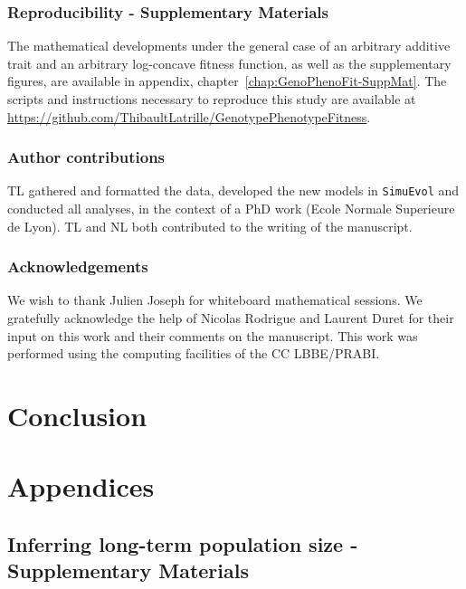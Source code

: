 \documentclass[a4paper,oneside,nobind]{thesis}
\begin{document}
    {\hypersetup{linkcolor=GREYDARK}\minitoc}

    


    \section{Reproducibility - Supplementary Materials}
    The mathematical developments under the general case of an arbitrary additive trait and an arbitrary log-concave fitness function, as well as the supplementary figures, are available in appendix, chapter~\ref{chap:GenoPhenoFit-SuppMat}.
    The scripts and instructions necessary to reproduce this study are available at \url{https://github.com/ThibaultLatrille/GenotypePhenotypeFitness}.


    \section{Author contributions}
    TL gathered and formatted the data, developed the new models in \texttt{SimuEvol} and conducted all analyses, in the context of a PhD work (Ecole Normale Superieure de Lyon).
    TL and NL both contributed to the writing of the manuscript.


    \section{Acknowledgements}
    We wish to thank Julien Joseph for whiteboard mathematical sessions.
    We gratefully acknowledge the help of Nicolas Rodrigue and Laurent Duret for their input on this work and their comments on the manuscript.
    This work was performed using the computing facilities of the CC LBBE/PRABI.


    \part{Conclusion}
    \label{part:conclusion}
    



    \part{Appendices}

    \thispagestyle{empty}
    \chapter{Inferring long-term population size - Supplementary Materials}
    {\hypersetup{linkcolor=GREYDARK}\minitoc}
    \label{chap:MutSelDrift-SuppMat}
    
\end{document}
